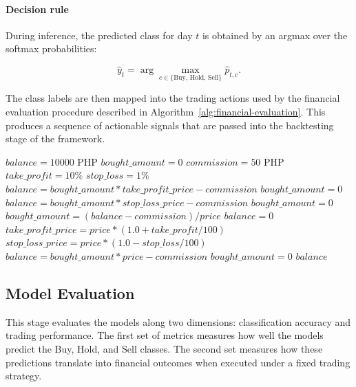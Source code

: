 \paragraph{Decision rule}

During inference, the predicted class for day $t$ is obtained by an argmax over the softmax probabilities:

\[
\hat{y}_t = \arg\max_{c \in \{\text{Buy, Hold, Sell}\}} \hat{p}_{t,c}.
\]

The class labels are then mapped into the trading actions used by the financial evaluation procedure described in Algorithm~\ref{alg:financial-evaluation}. This produces a sequence of actionable signals that are passed into the backtesting stage of the framework.

\begin{algorithm}[H]
	\footnotesize
	\caption{FinancialEvaluation}
	\label{alg:financial-evaluation}
	\begin{algorithmic}[1]
		\State $balance = 10000$ PHP
		\State $bought\_amount = 0$
		\State $commission = 50$ PHP
		\State $take\_profit = 10\%$
		\State $stop\_loss = 1\%$
		\State $balance = bought\_amount * take\_profit\_price - commission$
		\State $bought\_amount = 0$
		\EndIf
		\State $balance = bought\_amount * stop\_loss\_price - commission$
		\State $bought\_amount = 0$
		\EndIf
		\EndIf
		\State $bought\_amount = (balance - commission) / price$
		\State $balance = 0$
		\State $take\_profit\_price = price * (1.0 + take\_profit / 100)$
		\State $stop\_loss\_price = price * (1.0 - stop\_loss / 100)$
		\EndIf
		\State $balance = bought\_amount * price - commission$
		\State $bought\_amount = 0$
		\EndIf
		\EndFor
		\State \Return $balance$
		\EndProcedure
	\end{algorithmic}
\end{algorithm}


\subsection{Model Evaluation}
\label{subsec:model-eval}

This stage evaluates the models along two dimensions: classification accuracy and trading performance. The first set of metrics measures how well the models predict the Buy, Hold, and Sell classes. The second set measures how these predictions translate into financial outcomes when executed under a fixed trading strategy.


